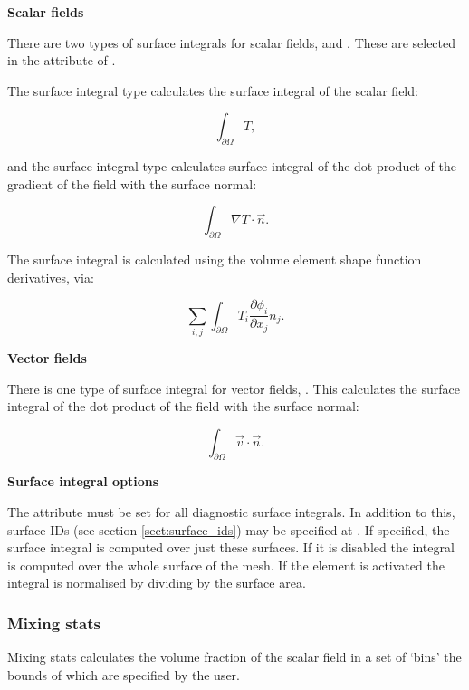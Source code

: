 \textbf{Scalar fields}

There are two types of surface integrals for scalar fields,  and
. These are selected in the  attribute of
.

The surface integral type  calculates the surface integral of the
scalar field:

\begin{equation}
\int_{\partial \Omega} T,
\end{equation}

and the surface integral type  calculates surface integral
of the dot product of the gradient of the field with the surface normal:

\begin{equation}
\int_{\partial \Omega} \nabla T \cdot \vec{n}.
\end{equation}

The  surface integral is calculated using the volume
element shape function derivatives, via:

\begin{equation}
\sum_{i,j} \int_{\partial \Omega} {T_i \frac{\partial \phi_i}{\partial x_j} n_j}.
\end{equation}

\textbf{Vector fields}

There is one type of surface integral for vector fields, . This
calculates the surface integral of the dot product of the field with the surface
normal:

\begin{equation}
\int_{\partial \Omega} \vec{v} \cdot \vec{n}.
\end{equation}

\textbf{Surface integral options}

The  attribute must be set for all diagnostic surface integrals. In
addition to this, surface IDs (see section \ref{sect:surface_ids}) may be specified at
. If specified, the surface
integral is computed over just these surfaces. If it is disabled the integral is computed
over the whole surface of the
mesh. If the element  is activated
the integral is normalised by dividing by the surface area.

\subsubsection{Mixing stats}
\label{sect:stat_mixing_stats}
Mixing stats calculates the volume fraction of the scalar field in a set of `bins' the bounds of which are specified by the user. 

